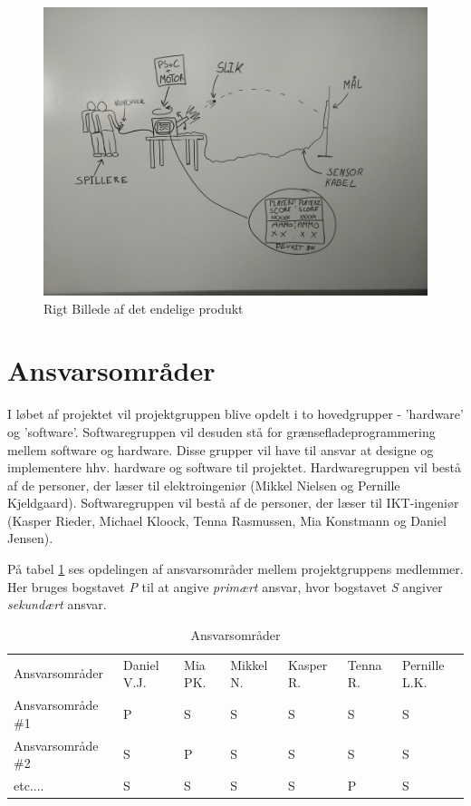 \begin{figure}[H]
	\centering
	\includegraphics[width=\textwidth]{Projektformulering/images/rigtBillede}
	\caption{Rigt Billede af det endelige produkt}
	\label{ref:RigtBillede}
\end{figure}

\newpage
\section{Ansvarsområder}
I løbet af projektet vil projektgruppen blive opdelt i to hovedgrupper - 'hardware' og 'software'. Softwaregruppen vil desuden stå for grænsefladeprogrammering mellem software og hardware. Disse grupper vil have til ansvar at designe og implementere hhv. hardware og software til projektet. Hardwaregruppen vil bestå af de personer, der læser til elektroingeniør (Mikkel Nielsen og Pernille Kjeldgaard). Softwaregruppen vil bestå af de personer, der læser til IKT-ingeniør (Kasper Rieder, Michael Kloock, Tenna Rasmussen, Mia Konstmann og Daniel Jensen).

På tabel \ref{tabel:ansvarsområder} ses opdelingen af ansvarsområder mellem projektgruppens medlemmer. Her bruges bogstavet \textit{P} til at angive \textit{primært} ansvar, hvor bogstavet \textit{S} angiver \textit{sekundært} ansvar.

\begin{table}[H]
	\centering
	\begin{tabular}{lllllll}
		Ansvarsområder    & Daniel V.J. & Mia PK. & Mikkel N. & Kasper R. & Tenna R. & Pernille L.K. \\
		\rowcolor[HTML]{CBCEFB} 
		Ansvarsområde \#1 & P           & S       & S         & S         & S        & S             \\
		Ansvarsområde \#2 & S           & P       & S         & S         & S        & S             \\
		\rowcolor[HTML]{CBCEFB} 
		etc....           & S           & S       & S         & S         & P        & S            
	\end{tabular}
	\caption{Ansvarsområder}
	\label{tabel:ansvarsområder}
\end{table}